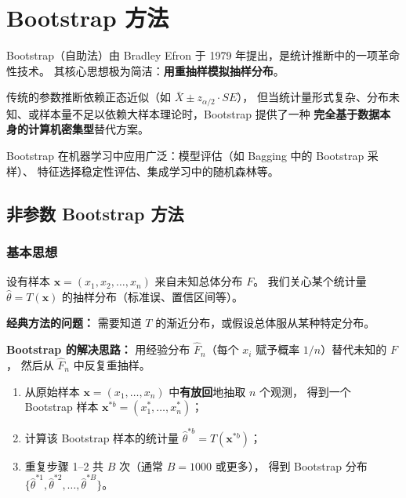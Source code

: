 \chapter{Bootstrap 方法}

Bootstrap（自助法）由 Bradley Efron 于 1979 年提出，是统计推断中的一项革命性技术。
其核心思想极为简洁：\textbf{用重抽样模拟抽样分布}。

传统的参数推断依赖正态近似（如 $\bar{X} \pm z_{\alpha/2} \cdot SE$），
但当统计量形式复杂、分布未知、或样本量不足以依赖大样本理论时，Bootstrap 提供了一种
\textbf{完全基于数据本身的计算机密集型}替代方案。

Bootstrap 在机器学习中应用广泛：模型评估（如 Bagging 中的 Bootstrap 采样）、
特征选择稳定性评估、集成学习中的随机森林等。

\section{非参数 Bootstrap 方法}

\subsection{基本思想}

设有样本 $\bm{x} = (x_1, x_2, \dots, x_n)$ 来自未知总体分布 $F$。
我们关心某个统计量 $\hat{\theta} = T(\bm{x})$ 的抽样分布（标准误、置信区间等）。

\textbf{经典方法的问题：} 需要知道 $T$ 的渐近分布，或假设总体服从某种特定分布。

\textbf{Bootstrap 的解决思路：} 用经验分布 $\hat{F}_n$（每个 $x_i$ 赋予概率 $1/n$）替代未知的 $F$，
然后从 $\hat{F}_n$ 中反复重抽样。

\begin{definition}
\begin{enumerate}
    \item 从原始样本 $\bm{x} = (x_1, \dots, x_n)$ 中\textbf{有放回}地抽取 $n$ 个观测，
          得到一个 Bootstrap 样本 $\bm{x}^{*b} = (x_1^{*}, \dots, x_n^{*})$；
    \item 计算该 Bootstrap 样本的统计量 $\hat{\theta}^{*b} = T(\bm{x}^{*b})$；
    \item 重复步骤 1--2 共 $B$ 次（通常 $B = 1000$ 或更多），
          得到 Bootstrap 分布 $\{\hat{\theta}^{*1}, \hat{\theta}^{*2}, \dots, \hat{\theta}^{*B}\}$。
\end{enumerate}
\end{definition}

